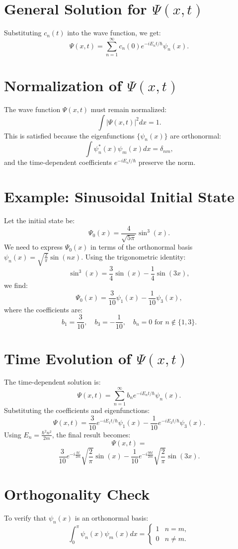 \documentclass[a4paper,12pt]{article}
\begin{document}
\begin{multicols}{2}
\section{General Solution for $\Psi(x,t)$}
Substituting $c_n(t)$ into the wave function, we get:
\[
\Psi(x,t) = \sum_{n=1}^\infty c_n(0)e^{-iE_n t/\hbar}\psi_n(x).
\]

\section{Normalization of $\Psi(x,t)$}
The wave function $\Psi(x,t)$ must remain normalized:
\[
\int |\Psi(x,t)|^2 dx = 1.
\]
This is satisfied because the eigenfunctions $\{\psi_n(x)\}$ are orthonormal:
\[
\int \psi_n^*(x) \psi_m(x) dx = \delta_{nm},
\]
and the time-dependent coefficients $e^{-iE_n t/\hbar}$ preserve the norm.

\section{Example: Sinusoidal Initial State}
Let the initial state be:
\[
\Psi_0(x) = \frac{4}{\sqrt{5\pi}} \sin^3(x).
\]
We need to express $\Psi_0(x)$ in terms of the orthonormal basis $\psi_n(x) = \sqrt{\frac{2}{\pi}}\sin(nx)$. Using the trigonometric identity:
\[
\sin^3(x) = \frac{3}{4}\sin(x) - \frac{1}{4}\sin(3x),
\]
we find:
\[
\Psi_0(x) = \frac{3}{10}\psi_1(x) - \frac{1}{10}\psi_3(x),
\]
where the coefficients are:
\[
b_1 = \frac{3}{10}, \quad b_3 = -\frac{1}{10}, \quad b_n = 0 \text{ for } n \notin \{1,3\}.
\]

\section{Time Evolution of $\Psi(x,t)$}
The time-dependent solution is:
\[
\Psi(x,t) = \sum_{n=1}^\infty b_n e^{-iE_n t/\hbar} \psi_n(x).
\]
Substituting the coefficients and eigenfunctions:
\[
\Psi(x,t) = \frac{3}{10}e^{-iE_1t/\hbar}\psi_1(x) - \frac{1}{10}e^{-iE_3t/\hbar}\psi_3(x).
\]
Using $E_n = \frac{\hbar^2n^2}{2m}$, the final result becomes:
\[
\Psi(x,t) = 
\]
\[
\frac{3}{10} e^{-i\frac{\hbar t}{2m}} \sqrt{\frac{2}{\pi}} \sin(x) - \frac{1}{10} e^{-i\frac{9\hbar t}{2m}} \sqrt{\frac{2}{\pi}} \sin(3x).
\]

\section{Orthogonality Check}
To verify that $\psi_n(x)$ is an orthonormal basis:
\[
\int_0^\pi \psi_n(x)\psi_m(x) dx =
\begin{cases} 
1 & n = m, \\
0 & n \neq m.
\end{cases}
\]


\end{multicols}
\end{document}
